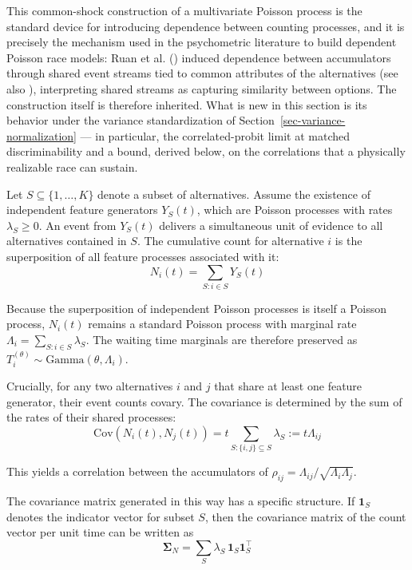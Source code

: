\documentclass[
  man,
  floatsintext,
  longtable,
  a4paper,
  nolmodern,
  notxfonts,
  notimes,
  colorlinks=true,linkcolor=blue,citecolor=blue,urlcolor=blue]{apa7}
\begin{document}
This common-shock construction of a multivariate Poisson process is the
standard device for introducing dependence between counting processes,
and it is precisely the mechanism used in the psychometric literature to
build dependent Poisson race models: Ruan et al.
() induced dependence
between accumulators through shared event streams tied to common
attributes of the alternatives (see also
), interpreting shared streams as capturing similarity
between options. The construction itself is therefore inherited. What is
new in this section is its behavior under the variance standardization
of Section~\ref{sec-variance-normalization} --- in particular, the
correlated-probit limit at matched discriminability and a bound, derived
below, on the correlations that a physically realizable race can
sustain.

Let \(S \subseteq \{1, \dots, K\}\) denote a subset of alternatives.
Assume the existence of independent feature generators \(Y_S(t)\), which
are Poisson processes with rates \(\lambda_S \ge 0\). An event from
\(Y_S(t)\) delivers a simultaneous unit of evidence to all alternatives
contained in \(S\). The cumulative count for alternative \(i\) is the
superposition of all feature processes associated with it: \[
N_i(t) = \sum_{S: i \in S} Y_S(t)
\]

Because the superposition of independent Poisson processes is itself a
Poisson process, \(N_i(t)\) remains a standard Poisson process with
marginal rate \(\Lambda_i = \sum_{S: i \in S} \lambda_S\). The waiting
time marginals are therefore preserved as
\(T_i^{(\theta)} \sim \text{Gamma}(\theta, \Lambda_i)\).

Crucially, for any two alternatives \(i\) and \(j\) that share at least
one feature generator, their event counts covary. The covariance is
determined by the sum of the rates of their shared processes: \[
\text{Cov}(N_i(t), N_j(t)) = t \sum_{S: \{i,j\} \subseteq S} \lambda_S := t \Lambda_{ij}
\]

This yields a correlation between the accumulators of
\(\rho_{ij} = \Lambda_{ij} / \sqrt{\Lambda_i \Lambda_j}\).

The covariance matrix generated in this way has a specific structure. If
\(\mathbf{1}_S\) denotes the indicator vector for subset \(S\), then the
covariance matrix of the count vector per unit time can be written as \[
\boldsymbol{\Sigma}_N = \sum_S \lambda_S \, \mathbf{1}_S \mathbf{1}_S^\top
\]
\end{document}
